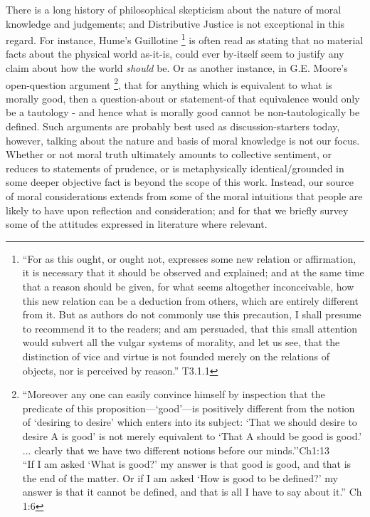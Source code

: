 There is a long history of philosophical skepticism about the nature of moral knowledge and judgements; and Distributive Justice is not exceptional in this regard.
For instance, Hume's Guillotine \cite{HumeGutenberg}\footnote{``For as this ought, or ought not, expresses some new relation or affirmation, it is necessary that it should be observed and explained; and at the same time that a reason should be given, for what seems altogether inconceivable, how this new relation can be a deduction from others, which are entirely different from it. But as authors do not commonly use this precaution, I shall presume to recommend it to the readers; and am persuaded, that this small attention would subvert all the vulgar systems of morality, and let us see, that the distinction of vice and virtue is not founded merely on the relations of objects, nor is perceived by reason.'' T3.1.1} is often read as stating that no material facts about the physical world as-it-is, could ever by-itself seem to justify any claim about how the world \textit{should} be.
Or as another instance, in G.E. Moore's open-question argument \cite{MooreGutenberg}\footnote{
``Moreover any one can easily convince himself by inspection that the predicate of this proposition—`good'—is positively different from the notion of ‘desiring to desire' which enters into its subject: `That we should desire to desire A is good’ is not merely equivalent to `That A should be good is good.' ... clearly that we have two different notions before our minds.''Ch1:13\\
``If I am asked ‘What is good?’ my answer is that good is good, and that is the end of the matter. Or if I am asked ‘How is good to be defined?’ my answer is that it cannot be defined, and that is all I have to say about it.'' Ch 1:6}, that for anything which is equivalent to what is morally good, then a question-about or statement-of that equivalence would only be a tautology - and hence what is morally good cannot be non-tautologically be defined.
Such arguments are probably best used as discussion-starters today, however, talking about the nature and basis of moral knowledge is not our focus.
Whether or not moral truth ultimately amounts to collective sentiment, or reduces to  statements of prudence, or is metaphysically identical/grounded in some deeper objective fact is beyond the scope of this work.
Instead, our source of moral considerations extends from some of the moral intuitions that people are likely to have upon reflection and consideration; and for that we briefly survey some of the attitudes expressed in literature where relevant.


